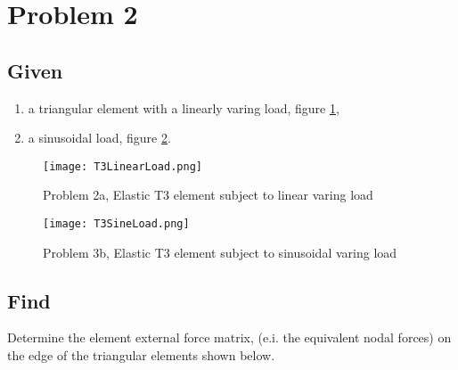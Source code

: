 \documentclass[a4paper]{memoir}
\begin{document}
\section{Problem 2}
\subsection{Given}
\begin{enumerate}
	\item  a triangular element with a linearly varing load, figure \ref{fig:t3_linear_load},
	\item  a sinusoidal load, figure \ref{fig:t3_sinusoidal_load}.
\end{enumerate}

\begin{figure}
	\centering
		\texttt{[image: T3LinearLoad.png]}
	\caption{Problem 2a, Elastic T3 element subject to linear varing load}
	\label{fig:t3_linear_load}
\end{figure}

\begin{figure}
	\centering
		\texttt{[image: T3SineLoad.png]}
	\caption{Problem 3b, Elastic T3 element subject to sinusoidal varing load}
	\label{fig:t3_sinusoidal_load}
\end{figure}

\subsection{Find}
Determine the element external force matrix, (e.i. the equivalent nodal forces) on the edge of the triangular elements shown below.
\end{document}
